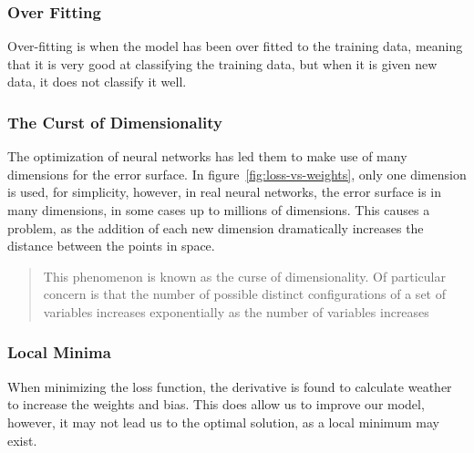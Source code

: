 \documentclass[titlepage]{article}
\begin{document}
\subsubsection{Over Fitting}
Over-fitting is when the model has been over fitted to the training data, meaning that it is very good at classifying the training data, but when it is given new data, it does not classify it well.

\subsubsection{The Curst of Dimensionality}
The optimization of neural networks has led them to make use of many dimensions for the error surface. In figure~\ref{fig:loss-vs-weights}, only one dimension is used, for simplicity, however, in real neural networks, the error surface is in many dimensions, in some cases up to millions of dimensions. This causes a problem, as the addition of each new dimension dramatically increases the distance between the points in space.\cite{curse-of-dimensionality}
\begin{quotation}
    This phenomenon is known as the curse of dimensionality. Of particular concern is that the number of possible distinct configurations of a set of variables increases exponentially as the number of variables increases
\end{quotation}

\subsubsection{Local Minima}
When minimizing the loss function, the derivative is found to calculate weather to increase the weights and bias. This does allow us to improve our model, however, it may not lead us to the optimal solution, as a local minimum may exist.
\end{document}
